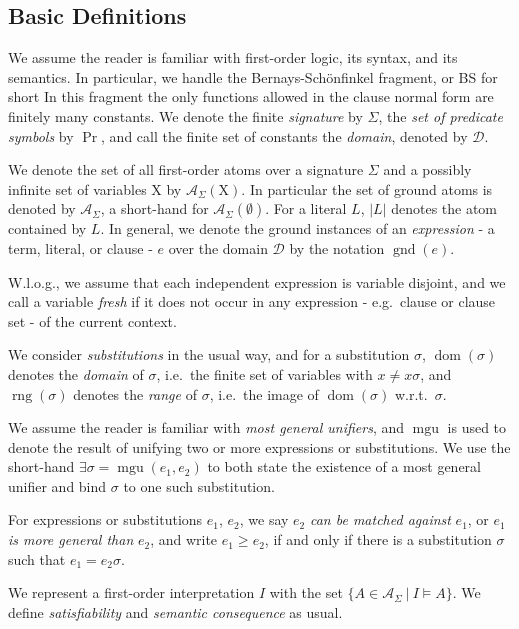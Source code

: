 \documentclass[a4paper]{article}
\newcommand{\mGnd}{\operatorname{gnd}} \newcommand{\mLVar}{\operatorname{lvar}} \newcommand{\mRVar}{\operatorname{rvar}} \newcommand{\mDmn}{\operatorname{dom}} \newcommand{\mRng}{\operatorname{rng}} \newcommand{\mMGU}{\operatorname{mgu}} \newcommand{\mDef}{\operatorname{def}} \newcommand{\mDomain}{\mathcal{D}} \newcommand{\mVar}{\operatorname{var}}
\newcommand{\mEPR}{Bernays-Sch\"onfinkel}
\newcommand{\mEPRs}{BS}
\begin{document}
\subsection{Basic Definitions}

We assume the reader is familiar with first-order logic, its syntax, and its semantics. 
In particular, we handle the {\mEPR} fragment, or {\mEPRs} for short
In this fragment the only functions allowed in the clause normal form are finitely many constants.
We denote the finite \emph{signature} by $\Sigma$, the \emph{set of predicate symbols} by $\operatorname{Pr}$, 
and call the finite set of constants the \emph{domain}, denoted by $\mDomain$.  



We denote the set of all first-order atoms over a signature $\Sigma$ and a possibly infinite set of variables $\text{X}$ by 
$\mathcal{A}_{\Sigma}(\text{X})$. 
In particular the set of ground atoms is denoted by $\mathcal{A}_{\Sigma}$, a short-hand for $\mathcal{A}_{\Sigma}(\emptyset)$.
For a literal $L$, $|L|$ denotes the atom contained by $L$.
In general, we denote the ground instances of an \emph{expression} - a term, literal, or clause - 
$e$ over the domain $\mDomain$ by the notation $\mGnd(e)$. 

W.l.o.g., we assume that each independent expression is variable disjoint, and we call a variable \emph{fresh} if it does not occur in any expression - e.g.\ clause or clause set - of the current context. 

We consider \emph{substitutions} in the usual way, and for a substitution $\sigma$, $\mDmn(\sigma)$ denotes the \emph{domain} of $\sigma$, i.e.\
the finite set of variables with $x \ne x\sigma$, and $\mRng(\sigma)$ denotes the \emph{range} of $\sigma$, i.e.\
the image of $\mDmn(\sigma)$ w.r.t.\ $\sigma$.

We assume the reader is familiar with \emph{most general unifiers}, 
and $\mMGU$ is used to denote the result of unifying two or more
expressions or substitutions.
We use the short-hand $\exists \sigma = \mMGU(e_1, e_2)$ to both state the existence of a most general unifier and bind 
$\sigma$ to one such substitution.



For expressions or substitutions $e_1$, $e_2$, we say $e_2$ \emph{can be matched against} $e_1$, or $e_1$ \emph{is more general than} $e_2$, and 
write $e_1 \geq e_2$, if and only if there is a substitution $\sigma$ such that $e_1 = e_2\sigma$. 

We represent a first-order interpretation $I$ with the set $\{ A \in \mathcal{A}_{\Sigma}~|~I \models A\}$.
We define \emph{satisfiability} and \emph{semantic consequence} as usual.
\end{document}

